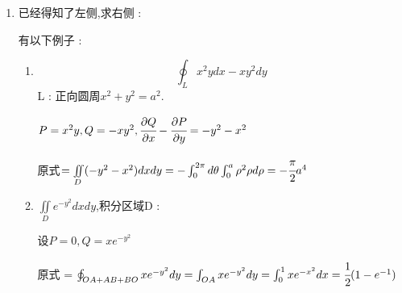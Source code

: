 \documentclass[UTF8,12pt]{ctexbook}
\newcommand{\definiteIntegral}[2]{\int^{#1}_{#2}}
\newcommand{\partialDerivativeFrac}[2]{\cfrac{\partial #1}{\partial #2}}
\newcommand{\doubleIntegralOnZone}[1]{\iint\limits_{#1}}
\newcommand{\pathIntegral}[1]{\int_{#1}}
\newcommand{\curveIntegralOnLine}[1]{\oint_{#1}}
\begin{document}
{{{{\begin{enumerate}
{              还有一种可能的取值是$A = \curveIntegralOnLine{L}xdy = -\curveIntegralOnLine{L}ydx = \cfrac{1}{2}\curveIntegralOnLine{L}(-ydx + xdy)$

              即 : 设$P = -y,Q = x,\partialDerivativeFrac{Q}{x} = 1,\partialDerivativeFrac{P}{y} = -1$

              那么$2\doubleIntegralOnZone{D}dxdy = \curveIntegralOnLine{L}xdy - ydx$

              所以$A = \cfrac{1}{2}\curveIntegralOnLine{L}xdy - ydx$

              $A$:积分区域面积
              }
        \item {
              已经得知了左侧,求右侧 :

              有以下例子 :
              \begin{enumerate}
                \item {
                      $$
                        \curveIntegralOnLine{L}x^2ydx - xy^2dy
                      $$
                      L : 正向圆周$x^2 + y^2 = a^2$.

                      $P = x^2y,Q =-xy^2,\partialDerivativeFrac{Q}{x} - \partialDerivativeFrac{P}{y} = -y^2-x^2$

                      原式$=\doubleIntegralOnZone{D}(-y^2-x^2)dxdy = -\definiteIntegral{2\pi}{0}d\theta\definiteIntegral{a}{0}\rho^2\rho d\rho = -\cfrac{\pi}{2}a^4$
                      }
                \item {
                      $\doubleIntegralOnZone{D}e^{-y^2}dxdy$,积分区域D : 

                      设$P = 0,Q = xe^{-y^2}$

                      原式 = \begin{math}
                        \curveIntegralOnLine{OA + AB + BO}xe^{-y^2}dy \\
                        =\pathIntegral{OA}xe^{-y^2}dy \\
                        =\definiteIntegral{1}{0}xe^{-x^2}dx \\
                        =\cfrac{1}{2}(1 - e^{-1})
                      \end{math}

}
\end{enumerate}}
\end{enumerate}}}}}
\end{document}
